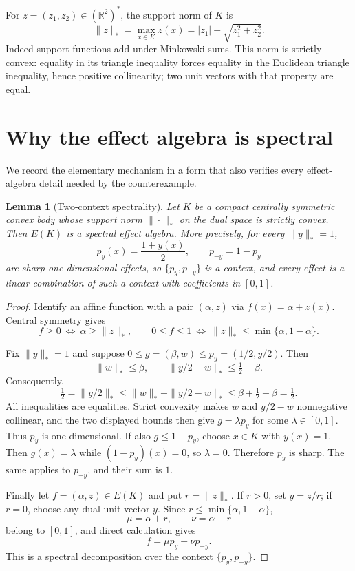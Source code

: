 \documentclass[11pt]{article}
\newtheorem{lemma}[theorem]{Lemma}
\begin{document}
For $z=(z_1,z_2)\in(\mathbb R^2)^*$, the support norm of $K$ is
\begin{equation}\label{eq:dualnorm}
 \|z\|_*=\max_{x\in K}z(x)
 =|z_1|+\sqrt{z_1^2+z_2^2}.
\end{equation}
Indeed support functions add under Minkowski sums.  This norm is strictly
convex: equality in its triangle inequality forces equality in the
Euclidean triangle inequality, hence positive collinearity; two unit
vectors with that property are equal.

\section{Why the effect algebra is spectral}

We record the elementary mechanism in a form that also verifies every
effect-algebra detail needed by the counterexample.

\begin{lemma}[Two-context spectrality]\label{lem:spectral}
Let $K$ be a compact centrally symmetric convex body whose support norm
$\|\cdot\|_*$ on the dual space is strictly convex.  Then $E(K)$ is a
spectral effect algebra.  More precisely, for every $\|y\|_*=1$,
\[
 p_y(x)=\frac{1+y(x)}2,\qquad p_{-y}=1-p_y
\]
are sharp one-dimensional effects, so $\{p_y,p_{-y}\}$ is a context, and
every effect is a linear combination of such a context with coefficients
in $[0,1]$.
\end{lemma}

\begin{proof}
Identify an affine function with a pair $(\alpha,z)$ via
$f(x)=\alpha+z(x)$.  Central symmetry gives
\[
 f\geq0\ \Longleftrightarrow\ \alpha\geq\|z\|_*,
 \qquad
 0\leq f\leq1\ \Longleftrightarrow\
 \|z\|_*\leq\min\{\alpha,1-\alpha\}.
\]

Fix $\|y\|_*=1$ and suppose $0\leq g=(\beta,w)\leq
p_y=(1/2,y/2)$.  Then
\[
 \|w\|_*\leq\beta,\qquad
 \|y/2-w\|_*\leq\tfrac12-\beta.
\]
Consequently,
\[
 \tfrac12=\|y/2\|_*
 \leq\|w\|_*+\|y/2-w\|_*
 \leq\beta+\tfrac12-\beta=\tfrac12.
\]
All inequalities are equalities.  Strict convexity makes $w$ and
$y/2-w$ nonnegative collinear, and the two displayed bounds then give
$g=\lambda p_y$ for some $\lambda\in[0,1]$.  Thus $p_y$ is
one-dimensional.  If also $g\leq1-p_y$, choose $x\in K$ with $y(x)=1$.
Then $g(x)=\lambda$ while $(1-p_y)(x)=0$, so $\lambda=0$.
Therefore $p_y$ is sharp.  The same applies to $p_{-y}$, and their sum is
$1$.

Finally let $f=(\alpha,z)\in E(K)$ and put $r=\|z\|_*$.  If $r>0$, set
$y=z/r$; if $r=0$, choose any dual unit vector $y$.  Since
$r\leq\min\{\alpha,1-\alpha\}$,
\[
 \mu=\alpha+r,\qquad \nu=\alpha-r
\]
belong to $[0,1]$, and direct calculation gives
\[
 f=\mu p_y+\nu p_{-y}.
\]
This is a spectral decomposition over the context
$\{p_y,p_{-y}\}$.
\end{proof}
\end{document}
